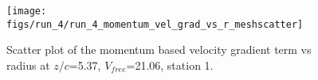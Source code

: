 \begin{figure}[H]
\centering
\texttt{[image: figs/run\_4/run\_4\_momentum\_vel\_grad\_vs\_r\_meshscatter]}
\caption{Scatter plot of the momentum based velocity gradient term vs radius at $z/c$=5.37, $V_{free}$=21.06, station 1.}
\label{fig:run_4_momentum_vel_grad_vs_r_meshscatter}
\end{figure}


